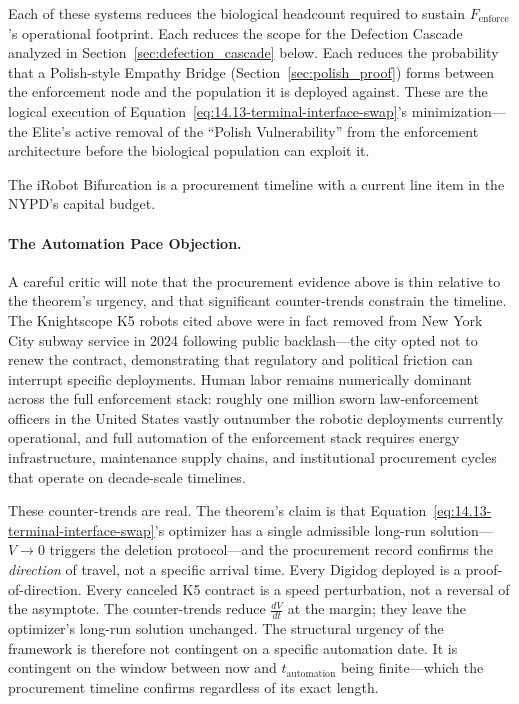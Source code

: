 Each of these systems reduces the biological headcount required to sustain $F_{\text{enforce}}$'s operational footprint. Each reduces the scope for the Defection Cascade analyzed in Section~\ref{sec:defection_cascade} below. Each reduces the probability that a Polish-style Empathy Bridge (Section~\ref{sec:polish_proof}) forms between the enforcement node and the population it is deployed against. These are the logical execution of Equation~\eqref{eq:14.13-terminal-interface-swap}'s minimization---the Elite's active removal of the ``Polish Vulnerability'' from the enforcement architecture before the biological population can exploit it.

The iRobot Bifurcation is a procurement timeline with a current line item in the NYPD's capital budget.

\paragraph{The Automation Pace Objection.} A careful critic will note that the procurement evidence above is thin relative to the theorem's urgency, and that significant counter-trends constrain the timeline. The Knightscope K5 robots cited above were in fact removed from New York City subway service in 2024 following public backlash---the city opted not to renew the contract, demonstrating that regulatory and political friction can interrupt specific deployments. Human labor remains numerically dominant across the full enforcement stack: roughly one million sworn law-enforcement officers in the United States vastly outnumber the robotic deployments currently operational, and full automation of the enforcement stack requires energy infrastructure, maintenance supply chains, and institutional procurement cycles that operate on decade-scale timelines.

These counter-trends are real. The theorem's claim is that Equation~\eqref{eq:14.13-terminal-interface-swap}'s optimizer has a single admissible long-run solution---$V \to 0$ triggers the deletion protocol---and the procurement record confirms the \textit{direction} of travel, not a specific arrival time. Every Digidog deployed is a proof-of-direction. Every canceled K5 contract is a speed perturbation, not a reversal of the asymptote. The counter-trends reduce $\frac{dV}{dt}$ at the margin; they leave the optimizer's long-run solution unchanged. The structural urgency of the framework is therefore not contingent on a specific automation date. It is contingent on the window between now and $t_{\text{automation}}$ being finite---which the procurement timeline confirms regardless of its exact length.

